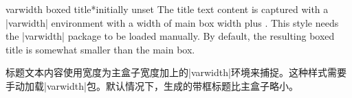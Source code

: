 \begin{docTcbKey}{varwidth boxed title*}{}{initially unset}
The title text content is captured with a |varwidth| environment with a width of main box width plus .
This style needs the |varwidth| package \cite{arseneau:2011a} to be loaded manually.
By default, the resulting boxed title is somewhat smaller than the main box.

标题文本内容使用宽度为主盒子宽度加上的|varwidth|环境来捕捉。这种样式需要手动加载|varwidth|包\cite{arseneau:2011a}。默认情况下，生成的带框标题比主盒子略小。
\end{docTcbKey}